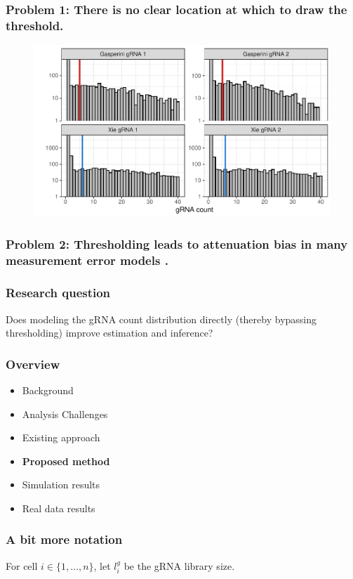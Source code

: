 \documentclass{beamer}
\begin{document}
\begin{frame}
\frametitle{Problem 1: There is no clear location at which to draw the threshold.}
\begin{figure}
	\centering
	\includegraphics[width=1\linewidth]{../figures/fig2/histograms}
\end{figure}


\end{frame}


\begin{frame}
\frametitle{Problem 2: Thresholding leads to attenuation bias in many measurement error models \cite{Stefanski2000}.}

\end{frame}


\begin{frame}
\frametitle{Research question}
Does modeling the gRNA count distribution directly (thereby bypassing thresholding) improve estimation and inference?
\end{frame}


\begin{frame}
\frametitle{Overview}
\begin{itemize}
	\item Background
	\item Analysis Challenges
	\item Existing approach
	\item \textbf{Proposed method}
	\item Simulation results
	\item Real data results
\end{itemize}
\end{frame}


\begin{frame}
\frametitle{A bit more notation}
For cell $i \in \{ 1, \dots, n\}$, let $l^g_i$ be the gRNA library size.
\end{frame}
\end{document}

